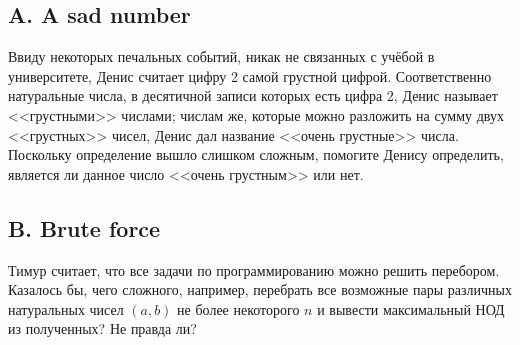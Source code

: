 \subsection*{A. A sad number}

Ввиду некоторых печальных событий, никак не связанных с учёбой в университете, Денис считает цифру 2 самой грустной цифрой. Соответственно натуральные числа, в десятичной записи которых есть цифра 2, Денис называет <<грустными>> числами; числам же, которые можно разложить на сумму двух <<грустных>> чисел, Денис дал название <<очень грустные>> числа. Поскольку определение вышло слишком сложным, помогите Денису определить, является ли данное число <<очень грустным>> или нет.







\subsection*{B. Brute force}

Тимур считает, что все задачи по программированию можно решить перебором. Казалось бы, чего сложного, например, перебрать все возможные пары различных натуральных чисел $(a, b)$ не более некоторого $n$ и вывести максимальный НОД из полученных? Не правда ли?







